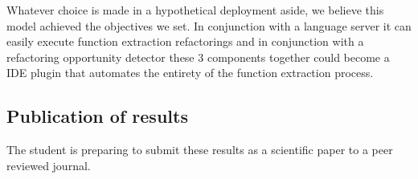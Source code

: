 Whatever choice is made in a hypothetical deployment aside, we believe this model achieved the objectives we set. In conjunction with a language server it can easily execute function extraction refactorings and in conjunction with a refactoring opportunity detector these 3 components together could become a IDE plugin that automates the entirety of the function extraction process.

\subsection{Publication of results}

The student is preparing to submit these results as a scientific paper to a peer reviewed journal.


